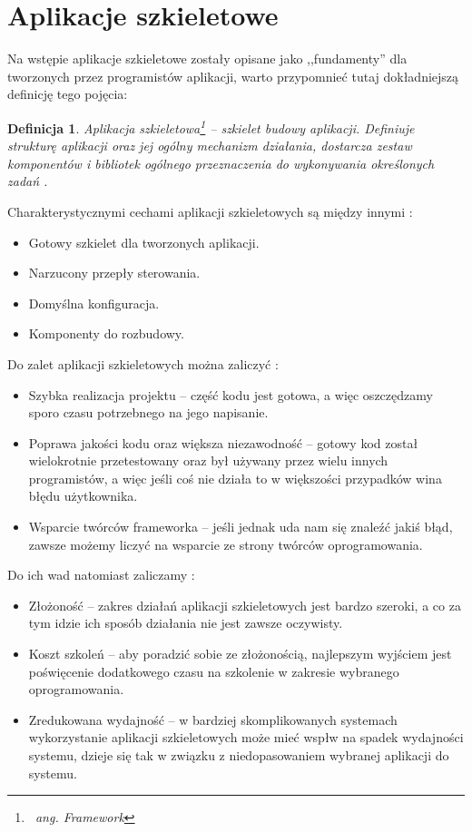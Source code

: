 \documentclass[12pt]{report}
\newtheorem{definition}{Definicja}
\begin{document}
\section{Aplikacje szkieletowe}

Na wstępie aplikacje szkieletowe zostały opisane jako ,,fundamenty'' dla tworzonych przez programistów aplikacji, warto przypomnieć tutaj dokładniejszą definicję tego
pojęcia:

\begin{definition}
Aplikacja szkieletowa\footnote{~ang. Framework} -- szkielet budowy aplikacji. Definiuje strukturę aplikacji oraz jej ogólny mechanizm działania, dostarcza zestaw komponentów
i bibliotek ogólnego przeznaczenia do wykonywania określonych zadań \cite{framework}.
\end{definition}

Charakterystycznymi cechami aplikacji szkieletowych są między innymi \cite{framework}:

\begin{itemize}
\item Gotowy szkielet dla tworzonych aplikacji.
\item Narzucony przepły sterowania.
\item Domyślna konfiguracja.
\item Komponenty do rozbudowy.
\end{itemize}

Do zalet aplikacji szkieletowych można zaliczyć \cite{framework}:

\begin{itemize}
\item Szybka realizacja projektu -- część kodu jest gotowa, a więc oszczędzamy sporo czasu potrzebnego na jego napisanie.
\item Poprawa jakości kodu oraz większa niezawodność -- gotowy kod został wielokrotnie przetestowany oraz był używany przez wielu innych programistów, a więc jeśli coś
nie działa to w większości przypadków wina błędu użytkownika.
\item Wsparcie twórców frameworka -- jeśli jednak uda nam się znaleźć jakiś błąd, zawsze możemy liczyć na wsparcie ze strony twórców oprogramowania.
\end{itemize}

Do ich wad natomiast zaliczamy \cite{framework}:

\begin{itemize}
\item Złożoność -- zakres działań aplikacji szkieletowych jest bardzo szeroki, a co za tym idzie ich sposób działania nie jest zawsze oczywisty.
\item Koszt szkoleń -- aby poradzić sobie ze złożonością, najlepszym wyjściem jest poświęcenie dodatkowego czasu na szkolenie w zakresie wybranego oprogramowania.
\item Zredukowana wydajność -- w bardziej skomplikowanych systemach wykorzystanie aplikacji szkieletowych może mieć wspłw na spadek wydajności systemu, dzieje się
tak w związku z niedopasowaniem wybranej aplikacji do systemu.
\end{itemize}
\end{document}

